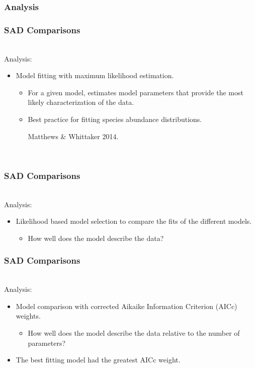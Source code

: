 \documentclass[14pt]{beamer}
\begin{document}
\subsubsection{Analysis}
\begin{frame}[t]
\frametitle{SAD Comparisons}
~\\
Analysis:
\begin{itemize}
\item Model fitting with maximum likelihood estimation.\\
\begin{itemize}
\item For a given model, estimates model parameters that provide the most likely characterization of the data.
\item Best practice for fitting species abundance distributions. \begin{tiny} Matthews \& Whittaker 2014.\end{tiny}
\end{itemize}
~\\
\end{itemize}
\end{frame} 


\begin{frame}[t]
\frametitle{SAD Comparisons}
~\\
Analysis:
\begin{itemize}
\item Likelihood based model selection to compare the fits of the different models.
\begin{itemize}
\item How well does the model describe the data?
\end{itemize}
\end{itemize}
\end{frame}

\begin{frame}[t]
\frametitle{SAD Comparisons}
~\\
Analysis:
\begin{itemize}
\item Model comparison with corrected Aikaike Information Criterion (AICc) weights.
\begin{itemize}
\item How well does the model describe the data relative to the number of parameters?
\end{itemize}
\item The best fitting model had the greatest AICc weight. 
\end{itemize}
\end{frame}
\end{document}

